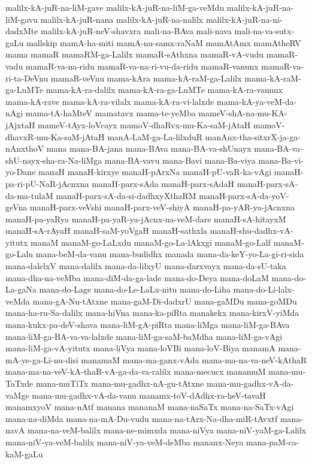 {malilx-kA-juR-na-liM-gave
malilx-kA-juR-na-liM-ga-veMdu
malilx-kA-juR-na-liM-gavu
malilx-kA-juR-nana
malilx-kA-juR-na-nalilx
malilx-kA-juR-na-ni-dadxMte
malilx-kA-juR-neV-shavxra
mali-na-BAva
mali-nava
mali-na-va-sutx-gaLu
mallskip
mamA-ha-miti
mamA-nu-samx-raNaM
mamAtAmx
mamAtheRV
mama
mamaR
mamaRM-ga-Lalilx
mamaR-sAthxna
mamaR-vA-vudu
mamaR-vadu
mamaR-va-na-ridu
mamaR-va-na-ri-vu-da-ridu
mamaR-vanunx
mamaR-va-ri-ta-DeVnu
mamaR-veVnu
mama-kAra
mama-kA-raM-ga-Lalilx
mama-kA-raM-ga-LuMTe
mama-kA-ra-dalilx
mama-kA-ra-ga-LuMTe
mama-kA-ra-vanunx
mama-kA-rave
mama-kA-ra-vilalx
mama-kA-ra-vi-lalxde
mama-kA-ya-veM-da-nAgi
mama-tA-haMteV
mamatavx
mama-te-yeMba
mameV-shA-na-mu-KA-jAjxtaH
mameV-tAyx-loVcayx
mamoV-dhaRvx-mu-Ka-saM-jAtaH
mamoV-dhavxR-mu-Ka-saM-jAtaH
manA-LaM-ga-La-lilxduR
manAnx-tha-sitxrX-ja-ga-nAnxthoV
mana
mana-BA-jana
mana-BAva
mana-BA-va-shUnayx
mana-BA-va-shU-nayx-sha-ra-Na-liMga
mana-BA-vavu
mana-Bavi
mana-Ba-viya
mana-Ba-vi-yo-Dane
manaH
manaH-kirxye
manaH-pArxNa
manaH-pU-vaR-ka-vAgi
manaH-pa-ri-pU-NaR-jAcnxna
manaH-parx-sAda
manaH-parx-sAdaH
manaH-parx-sA-da-ma-tulaM
manaH-parx-sA-da-si-dadhxyXthaRM
manaH-parx-sA-da-yoV-geVna
manaH-parx-veVshi
manaH-parx-veV-shiyA
manaH-pa-yAR-ya-jAcnxna
manaH-pa-yaRya
manaH-pa-yaR-ya-jAcnx-na-veM-dare
manaH-sA-hitayxM
manaH-sA-rAyaH
manaH-saM-yoVgaH
manaH-sathxla
manaH-shu-dadhx-vA-yitutx
manaM
manaM-go-LaLxdu
manaM-go-La-lAkxgi
manaM-go-Lalf
manaM-go-Lalu
mana-beM-da-vanu
mana-budidhx
manada
mana-da-keY-yo-La-gi-ri-sida
mana-dalelxV
mana-dalilx
mana-da-lilxyU
mana-darxvayx
mana-da-sU-taka
mana-dha-na-veMba
mana-diM-da-ga-lade
mana-do-Deya
mana-doLaM
mana-do-La-gaNa
mana-do-Lage
mana-do-Le-LaLx-nitu
mana-do-Liha
mana-do-Li-lalx-veMda
mana-gA-Nu-tAtxne
mana-gaM-Di-dadxrU
mana-gaMDu
mana-goMDu
mana-ha-ru-Sa-dalilx
mana-hiVna
mana-ka-piRta
manakekx
mana-kirxV-yiMda
mana-kukx-pa-deV-shava
mana-liM-gA-piRta
mana-liMga
mana-liM-ga-BAva
mana-liM-ga-BA-va-va-lalxde
mana-liM-ga-saM-baMdha
mana-liM-ga-vAgi
mana-liM-ga-vA-yitutx
mana-liVya
mana-loVBi
mana-loV-Biya
manamA
mana-mA-ye-ga-Li-nu-disi
manamaM
mana-ma-ganx-vAda
mana-ma-na-va-neV-kAthaR
mana-ma-na-veV-kA-thaR-vA-ga-da-va-ralilx
mana-mecucx
manamuM
mana-mu-TaTxde
mana-muTiTx
mana-mu-gadhx-nA-gu-tAtxne
mana-mu-gadhx-vA-da-vaMge
mana-mu-gadhx-vA-da-vanu
manamx-toV-dAdhx-ra-heV-tavaH
manamxyoV
mana-nAtf
manana
mananaM
mana-naSaTx
mana-na-SaTx-vAgi
mana-na-diMda
mana-na-mA-Du-vudu
mana-na-tArx-Na-dha-miR-tAvxtf
mana-navA
mana-na-veM-balilx
mana-ne-mimxda
mana-niVya
mana-niV-yaM-ga-Lalilx
mana-niV-ya-veM-balilx
mana-niV-ya-veM-deMba
mananx-Neya
mana-paM-ca-kaM-gaLu
}
